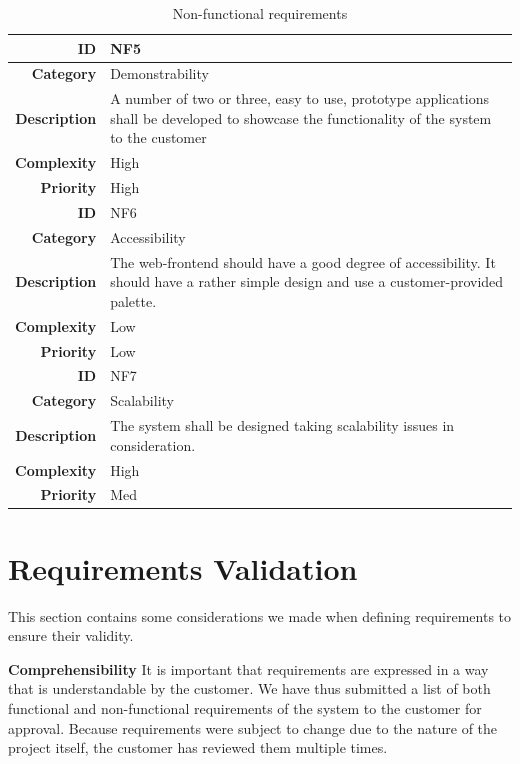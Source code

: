\begin{table}[h]
\begin{center}
\begin{tabular}{ | r | p{11.5cm} | }
  \textbf{ID} & NF5 \\
  \hline\noalign{\smallskip}\hline
  \textbf{Category}     & Demonstrability \\
  \textbf{Description}  & A number of two or three, easy to use, prototype applications
                          shall be developed to showcase the functionality of the system to the customer \\
  \textbf{Complexity}   & High \\
  \textbf{Priority}     & High \\
  \hline\noalign{\smallskip}\noalign{\smallskip}\hline
  
  \textbf{ID} & NF6 \\
  \hline\noalign{\smallskip}\hline
  \textbf{Category}     & Accessibility \\
  \textbf{Description}  & The web-frontend should have a good degree of accessibility.
                          It should have a rather simple design and use a customer-provided palette. \\
  \textbf{Complexity}   & Low \\
  \textbf{Priority}     & Low \\
  \hline\noalign{\smallskip}\noalign{\smallskip}\hline

  \textbf{ID} & NF7 \\
  \hline\noalign{\smallskip}\hline
  \textbf{Category}     & Scalability \\
  \textbf{Description}  & The system shall be designed taking scalability issues in consideration. \\
  \textbf{Complexity}   & High \\
  \textbf{Priority}     & Med \\

  \hline
\end{tabular}
\end{center}
\caption{Non-functional requirements}
\label{table:nonfunc}
\end{table}

\clearpage
\section{Requirements Validation}
\label{section:reqvalidation}

This section contains some considerations we made when defining requirements to ensure their validity\cite{Sommerville9}.

\textbf{Comprehensibility}\newline
It is important that requirements are expressed in a way that is understandable by the customer.
We have thus submitted a list of both functional and non-functional requirements of the system to the customer for approval. 
Because requirements were subject to change due to the nature of the project itself, the customer has reviewed them multiple times.

